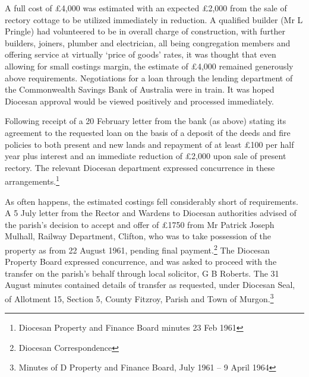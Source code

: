 A full cost of £4,000 was estimated with an expected £2,000 from the sale of rectory cottage to be utilized immediately in reduction. A qualified builder (Mr L Pringle) had volunteered to be in overall charge of construction, with further builders, joiners, plumber and electrician, all being congregation members and offering service at virtually `price of goods' rates, it was thought that even allowing for small costings margin, the estimate of £4,000 remained generously above requirements. Negotiations for a loan through the lending department of the Commonwealth Savings Bank of Australia were in train. It was hoped Diocesan approval would be viewed positively and processed immediately.

Following receipt of a 20 February letter from the bank (as above) stating its agreement to the requested loan on the basis of a deposit of the deeds and fire policies to both present and new lands and repayment of at least £100 per half year plus interest and an immediate reduction of £2,000 upon sale of present rectory. The relevant Diocesan department expressed concurrence in these arrangements.\footnote{Diocesan Property and Finance Board minutes 23 Feb 1961}

As often happens, the estimated costings fell considerably short of requirements. A 5 July letter from the Rector and Wardens to Diocesan authorities advised of the parish's decision to accept and offer of £1750 from Mr Patrick Joseph Mulhall, Railway Department, Clifton, who was to take possession of the property as from 22 August 1961, pending final payment.\footnote{Diocesan Correspondence} The Diocesan Property Board expressed concurrence, and was asked to proceed with the transfer on the parish's behalf through local solicitor, G B Roberts. The 31 August minutes contained details of transfer as requested, under Diocesan Seal, of Allotment 15, Section 5, County Fitzroy, Parish and Town of Murgon.\footnote{Minutes of D Property and Finance Board, July 1961 -- 9 April 1964}

